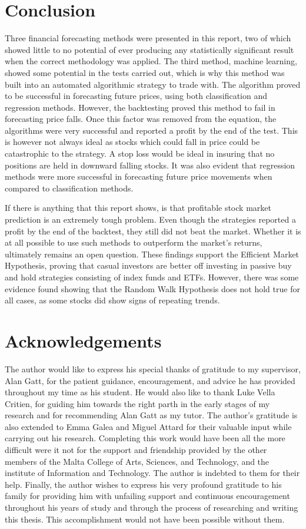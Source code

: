 \documentclass[times]{jtitauth}
\begin{document}
\section{Conclusion}
Three financial forecasting methods were presented in this report, two of which showed little to no potential of ever producing any statistically significant result when the correct methodology was applied. The third method, machine learning, showed some potential in the tests carried out, which is why this method was built into an automated algorithmic strategy to trade with. The algorithm proved to be successful in forecasting future prices, using both classification and regression methods. However, the backtesting proved this method to fail in forecasting price falls. Once this factor was removed from the equation, the algorithms were very successful and reported a profit by the end of the test. This is however not always ideal as stocks which could fall in price could be catastrophic to the strategy. A stop loss would be ideal in insuring that no positions are held in downward falling stocks. It was also evident that regression methods were more successful in forecasting future price movements when compared to classification methods.

If there is anything that this report shows, is that profitable stock market prediction is an extremely tough problem. Even though the strategies reported a profit by the end of the backtest, they still did not beat the market. Whether it is at all possible to use such methods to outperform the market’s returns, ultimately remains an open question. These findings support the Efficient Market Hypothesis, proving that casual investors are better off investing in passive buy and hold strategies consisting of index funds and ETFs. However, there was some evidence found showing that the Random Walk Hypothesis does not hold true for all cases, as some stocks did show signs of repeating trends.

\section*{Acknowledgements}

The author would like to express his special thanks of gratitude to my supervisor, Alan Gatt, for the patient guidance, encouragement, and advice he has provided throughout my time as his student. He would also like to thank Luke Vella Critien, for guiding him towards the right parth in the early stages of my research and for recommending Alan Gatt as my tutor. The author's gratitude is also extended to Emma Galea and Miguel Attard for their valuable input while carrying out his research. Completing this work would have been all the more difficult were it not for the support and friendship provided by the other members of the Malta College of Arts, Sciences, and Technology, and the institute of Information and Technology. The author is indebted to them for their help. Finally, the author wishes to express his very profound gratitude to his family for providing him with unfailing support and continuous encouragement throughout his years of study and through the process of researching and writing this thesis. This accomplishment would not have been possible without them. 
\end{document}
